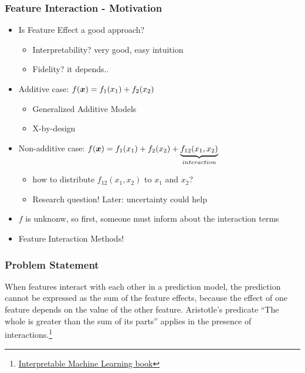 \begin{frame}
  \frametitle{Feature Interaction - Motivation}
  \begin{itemize}
  \item Is Feature Effect a good approach?
    \begin{itemize}
    \item Interpretability? very good, easy intuition
    \item Fidelity? it depends..
    \end{itemize}
  \item Additive case: \(f(\boldsymbol{x}) = f_1(x_1) + f_2(x_2)\)
    \begin{itemize}
    \item Generalized Additive Models
      \item X-by-design
    \end{itemize}

\item Non-additive case: \(f(\boldsymbol{x}) = f_1(x_1) + f_2(x_2) + \underbrace{f_{12}(x_1, x_2)}_{interaction}\)
  \begin{itemize}
  \item how to distribute \(f_{12}(x_1, x_2)\) to \(x_1\) and \(x_2\)?
  \item Research question! Later: uncertainty could help
  \end{itemize}
  \item \(f\) is unknonw, so first, someone must inform about the interaction terms
  \item Feature Interaction Methods!
\end{itemize}
\end{frame}


\begin{frame}
  \frametitle{Problem Statement}
  When features interact with each other in a prediction model, the prediction cannot be expressed as the sum of the feature effects, because the effect of one feature depends on the value of the other feature. Aristotle’s predicate “The whole is greater than the sum of its parts” applies in the presence of interactions.\footnote{\href{https://christophm.github.io/interpretable-ml-book/interaction.html}{Interpretable Machine Learning book}}
\end{frame}


